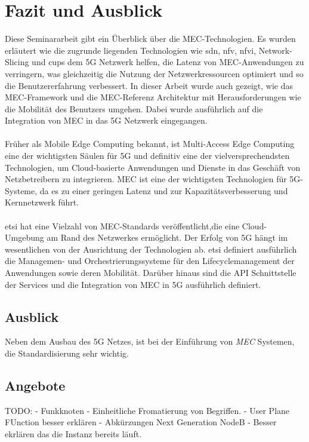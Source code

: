 \documentclass[runningheads]{llncs}
\numberwithin{figure}{section}
\begin{document}
\newpage

\section{Fazit und Ausblick}
Diese Seminararbeit gibt ein Überblick über die MEC-Technologien. Es wurden erläutert wie die 
zugrunde liegenden
Technologien wie \acrshort{sdn}, \acrshort{nfv}, \acrshort{nfvi}, Network-Slicing und \acrshort{cups}
dem 5G Netzwerk helfen, die Latenz von MEC-Anwendungen zu verringern, was gleichzeitig die Nutzung der
Netzwerkressourcen optimiert und so die Benutzererfahrung verbessert. In dieser Arbeit wurde auch gezeigt, 
wie das MEC-Framework und die MEC-Referenz Architektur mit Herausforderungen wie die Mobilität des Benutzers
umgehen. Dabei wurde ausführlich auf die Integration von MEC in das 5G Netzwerk eingegangen.
\\
\\
Früher als Mobile Edge Computing bekannt, ist Multi-Access Edge Computing eine der 
wichtigsten Säulen für 5G und  definitiv eine der vielversprechendsten Technologien, 
um Cloud-basierte Anwendungen und Dienste in das Geschäft von Netzbetreibern zu integrieren.
MEC ist eine der wichtigsten Technologien für 5G-Systeme, 
da es zu einer geringen Latenz und zur Kapazitätsverbesserung und Kernnetzwerk führt. 
\\
\\
\acrlong{etsi} hat eine Vielzahl von MEC-Standards veröffentlicht,die eine Cloud-Umgebung am Rand des 
Netzwerkes ermöglicht. Der Erfolg von 5G hängt im wesentlichen von der Ausrichtung der Technologien ab.
\acrshort{etsi} definiert ausführlich die Managemen- und Orchestrierungssysteme für den Lifecyclemanagement der 
Anwendungen sowie deren Mobilität. Darüber hinaus sind die API Schnittstelle der Services und die Integration
von MEC in 5G ausführlich definiert. 

\subsection{Ausblick}
Neben dem Ausbau des 5G Netzes, ist bei der Einführung von \textit{MEC} Systemen, 
die Standardisierung sehr wichtig.  \cite{abdullahSegmentRoutingSoftware21}
\subsection{Angebote}
\label{subsec:Angebote}
\label{sec:Ausblick}


\newpage
%
\printbibliography[heading=bibintoc]
TODO: 
- Funkknoten
- Einheitliche Fromatierung von Begriffen.
- User Plane FUnction besser erklären
- Abkürzungen Next Generation NodeB 
- Besser ekrlären das die Instanz bereits läuft.
\end{document}
